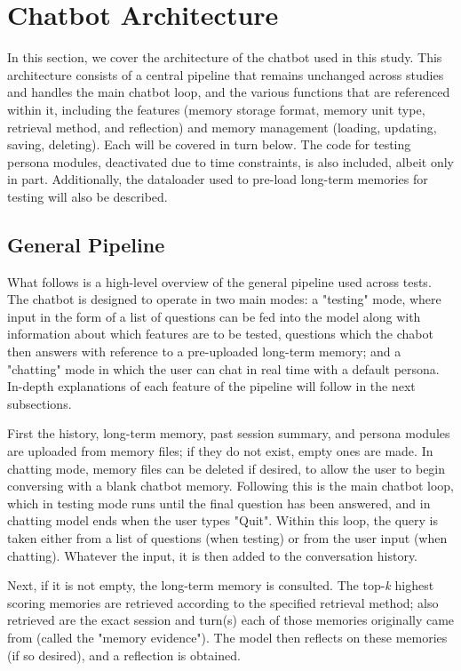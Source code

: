 \section{Chatbot Architecture}

In this section, we cover the architecture of the chatbot used in this study. This architecture consists of a central pipeline that remains unchanged across studies and handles the main chatbot loop, and the various functions that are referenced within it, including the features (memory storage format, memory unit type, retrieval method, and reflection) and memory management (loading, updating, saving, deleting). Each will be covered in turn below. The code for testing persona modules, deactivated due to time constraints, is also included, albeit only in part. Additionally, the dataloader used to pre-load long-term memories for testing will also be described.



\subsection{General Pipeline}

What follows is a high-level overview of the general pipeline used across tests. The chatbot is designed to operate in two main modes: a "testing" mode, where input in the form of a list of questions can be fed into the model along with information about which features are to be tested, questions which the chabot then answers with reference to a pre-uploaded long-term memory; and a "chatting" mode in which the user can chat in real time with a default persona. In-depth explanations of each feature of the pipeline will follow in the next subsections.

First the history, long-term memory, past session summary, and persona modules are uploaded from memory files; if they do not exist, empty ones are made. In chatting mode, memory files can be deleted if desired, to allow the user to begin conversing with a blank chatbot memory. Following this is the main chatbot loop, which in testing mode runs until the final question has been answered, and in chatting model ends when the user types "Quit". Within this loop, the query is taken either from a list of questions (when testing) or from the user input (when chatting). Whatever the input, it is then added to the conversation history.
 
Next, if it is not empty, the long-term memory is consulted. The top-\textit{k} highest scoring memories are retrieved according to the specified retrieval method; also retrieved are the exact session and turn(s) each of those memories originally came from (called the "memory evidence"). The model then reflects on these memories (if so desired), and a reflection is obtained. 

